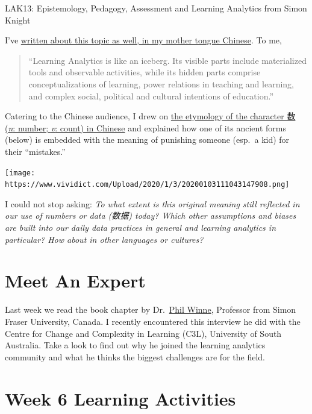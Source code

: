 \documentclass[
]{book}
\begin{document}
LAK13: Epistemology, Pedagogy, Assessment and Learning Analytics from Simon Knight

I've \href{https://www.researchgate.net/publication/317586037_Unpacking_Learning_Analytics_An_Attempt_to_Tilt_the_Iceberg_jiexixuexifenxixueyiciqiaodongbingshandechangshi}{written about this topic as well, in my mother tongue Chinese}. To me,

\begin{quote}
``Learning Analytics is like an iceberg. Its visible parts include materialized tools and observable activities, while its hidden parts comprise conceptualizations of learning, power relations in teaching and learning, and complex social, political and cultural intentions of education.''
\end{quote}

Catering to the Chinese audience, I drew on \href{https://www.vividict.com/Public/index/page/details/details.html?rid=11671}{the etymology of the character 数 (\emph{n}: number; \emph{v}: count) in Chinese} and explained how one of its ancient forms (below) is embedded with the meaning of punishing someone (esp.~a kid) for their ``mistakes.''

\texttt{[image: https://www.vividict.com/Upload/2020/1/3/20200103111043147908.png]}

I could not stop asking: \emph{To what extent is this original meaning still reflected in our use of numbers or data (数据) today? Which other assumptions and biases are built into our daily data practices in general and learning analytics in particular? How about in other languages or cultures?}

\hypertarget{meet-an-expert}{%
\section{Meet An Expert}\label{meet-an-expert}}

Last week we read the book chapter by Dr.~\href{https://www.sfu.ca/education/faculty-profiles/pwinne.html}{Phil Winne}, Professor from Simon Fraser University, Canada. I recently encountered this interview he did with the Centre for Change and Complexity in Learning (C3L), University of South Australia. Take a look to find out why he joined the learning analytics community and what he thinks the biggest challenges are for the field.

\hypertarget{week-6-learning-activities}{%
\section{Week 6 Learning Activities}\label{week-6-learning-activities}}
\end{document}
